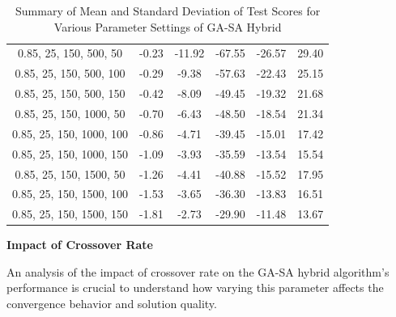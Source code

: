\documentclass{article}
\begin{document}
\begin{table}[H]
{\begin{tabular}{|c|c|c|c|c|c|}
                0.85, 25, 150, 500, 50     & -0.23                      & -11.92                     & -67.55                     & -26.57                   & 29.40                   \\
                0.85, 25, 150, 500, 100    & -0.29                      & -9.38                      & -57.63                     & -22.43                   & 25.15                   \\
                0.85, 25, 150, 500, 150    & -0.42                      & -8.09                      & -49.45                     & -19.32                   & 21.68                   \\
                0.85, 25, 150, 1000, 50    & -0.70                      & -6.43                      & -48.50                     & -18.54                   & 21.34                   \\
                0.85, 25, 150, 1000, 100   & -0.86                      & -4.71                      & -39.45                     & -15.01                   & 17.42                   \\
                0.85, 25, 150, 1000, 150   & -1.09                      & -3.93                      & -35.59                     & -13.54                   & 15.54                   \\
                0.85, 25, 150, 1500, 50    & -1.26                      & -4.41                      & -40.88                     & -15.52                   & 17.95                   \\
                0.85, 25, 150, 1500, 100   & -1.53                      & -3.65                      & -36.30                     & -13.83                   & 16.51                   \\
                0.85, 25, 150, 1500, 150   & -1.81                      & -2.73                      & -29.90                     & -11.48                   & 13.67                   \\
                \hline
            \end{tabular}
        }
        \caption{Summary of Mean and Standard Deviation of Test Scores for Various Parameter Settings of GA-SA Hybrid}
        \label{tab:gasa_summary_test_scores}
    \end{table}

    \textbf{Impact of Crossover Rate}

    An analysis of the impact of crossover rate on the GA-SA hybrid algorithm’s performance is crucial to understand how varying this parameter affects the convergence behavior and solution quality.
\end{document}
